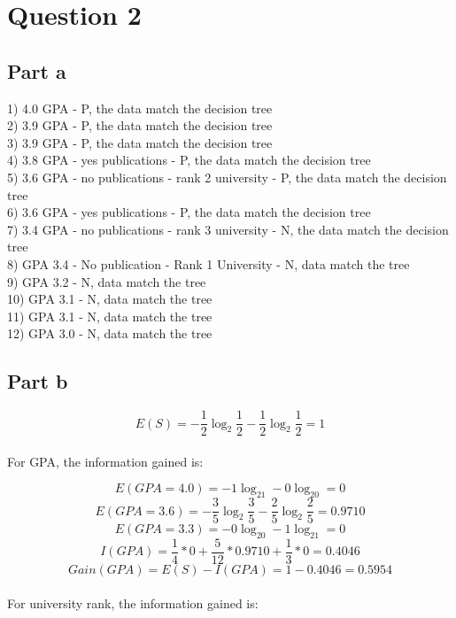 \documentclass[12pt]{article}
\begin{document}
\section*{Question 2}

\subsection*{Part a}

1) 4.0 GPA - P, the data match the decision tree\\
2) 3.9 GPA - P, the data match the decision tree\\
3) 3.9 GPA - P, the data match the decision tree\\
4) 3.8 GPA - yes publications - P, the data match the decision tree\\
5) 3.6 GPA - no publications - rank 2 university - P, the data match the decision tree\\
6) 3.6 GPA - yes publications - P, the data match the decision tree\\
7) 3.4 GPA - no publications - rank 3 university - N, the data match the decision tree\\
8) GPA 3.4 - No publication - Rank 1 University - N, data match the tree\\
9) GPA 3.2 - N, data match the tree\\
10) GPA 3.1 - N, data match the tree\\
11) GPA 3.1 - N, data match the tree\\
12) GPA 3.0 - N, data match the tree\\

\subsection*{Part b}

\begin{equation}
E(S) = -\frac{1}{2}\log_2\frac{1}{2} -\frac{1}{2}\log_2\frac{1}{2} = 1
\end{equation}
\\
For GPA, the information gained is:

\begin{equation}
E(GPA = 4.0) = -1\log_21 -0\log_20 = 0
\end{equation}
\begin{equation}
E(GPA = 3.6) = -\frac{3}{5}\log_2\frac{3}{5} -\frac{2}{5}\log_2\frac{2}{5} = 0.9710
\end{equation}
\begin{equation}
E(GPA = 3.3) = -0\log_20 -1\log_21 = 0
\end{equation}
\begin{equation}
I(GPA) = \frac{1}{4} * 0 + \frac{5}{12} * 0.9710 + \frac{1}{3} * 0 = 0.4046
\end{equation}
\begin{equation}
Gain(GPA) = E(S) - I(GPA) = 1 - 0.4046 = 0.5954
\end{equation}
\\
For university rank, the information gained is:
\end{document}
